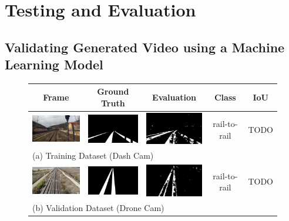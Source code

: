 \chapter{Testing and Evaluation}
\label{chapter:testing-and-evaluation}

\section{Validating Generated Video using a Machine Learning Model}
\label{sec:evaluate-ml}


\begin{figure}
\begin{tabular}{ccccc}
  Frame & Ground Truth & Evaluation & Class & IoU \\ \hline
  \includegraphics[width=30mm]{src/img/results-ml-0/par4/frame.jpg} & 
  \includegraphics[width=30mm]{src/img/results-ml-0/par4/seg.jpeg} & 
  \includegraphics[width=30mm]{src/img/results-ml-0/par4/det.jpg} &
  rail-to-rail & TODO \\
  \multicolumn{5}{l}{(a) Training Dataset (Dash Cam) } \\ \hline
  
  \includegraphics[width=30mm]{src/img/results-ml-0/par3/frame.jpg} & 
  \includegraphics[width=30mm]{src/img/results-ml-0/par3/seg.jpg} & 
  \includegraphics[width=30mm]{src/img/results-ml-0/par3/det.jpg} &
  rail-to-rail & TODO \\
  \multicolumn{5}{l}{ (b) Validation Dataset (Drone Cam) } \\ \hline
  

\end{tabular}
\end{figure}
